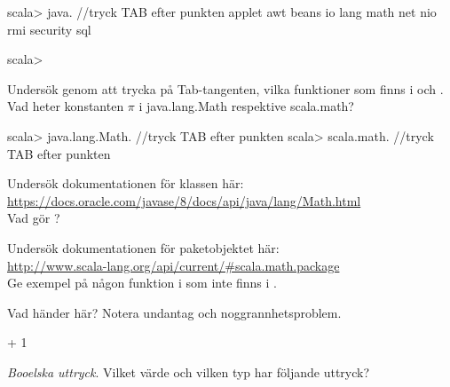{{{{{\begin{REPL}
scala> java.    //tryck TAB efter punkten
applet   awt   beans   io   lang   math   net   nio   rmi   security   sql

scala>
\end{REPL}

\Subtask Undersök genom att trycka på Tab-tangenten, vilka funktioner som finns i  och . Vad heter konstanten $\pi$ i java.lang.Math respektive scala.math?

\begin{REPL}
scala> java.lang.Math.    //tryck TAB efter punkten
scala> scala.math.        //tryck TAB efter punkten
\end{REPL}

\Subtask Undersök dokumentationen för klassen  här: \\ \url{https://docs.oracle.com/javase/8/docs/api/java/lang/Math.html} \\
Vad gör ?

\Subtask Undersök dokumentationen för paketobjektet  här: \\
\url{http://www.scala-lang.org/api/current/#scala.math.package} \\
Ge exempel på någon funktion i  som inte finns i .


\Task Vad händer här? Notera undantag  och noggrannhetsproblem. %

\Subtask {} + 1

\Subtask {}

\Subtask {}

\Subtask {}

\Subtask {}

\Subtask {}

\Subtask {}

\Subtask {}

\Subtask {}

\Subtask {}


\Task \textit{Booelska uttryck}. Vilket värde och vilken typ har följande uttryck?  %

\Subtask {}

}}}}}
